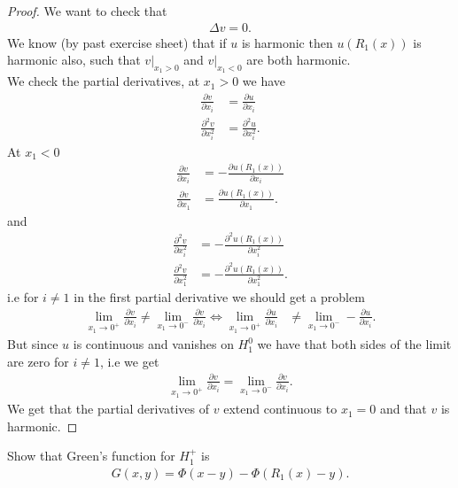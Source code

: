 \begin{proof}
 We want to check that 
 \begin{align*}
  \Delta v = 0
 .\end{align*}
 We know (by past exercise sheet) that if  $u$ is harmonic then $u(R_{1}(x))$ is harmonic also, such that
 $v \rvert_{x_{1}>0}$ and $v \rvert_{x_{1}<0}$ are both harmonic.\\[1ex]
 We check the partial derivatives, at $x_{1}>0$ we have
 \begin{align*}
   \frac{\partial v}{\partial x_i}&=  \frac{\partial u}{\partial x_i}\\
  \frac{\partial ^2 v}{\partial x_i^2}&=  \frac{\partial ^2 u}{\partial x_i^2}
 .\end{align*}
 At $x_1 <0$
 \begin{align*}
   \frac{\partial v}{\partial x_i}&=  - \frac{\partial u(R_{1}(x))}{\partial x_i}  \\
   \frac{\partial v}{\partial x_1} &= \frac{\partial u(R_{1}(x))}{\partial x_1} 
 .\end{align*}
 and 
 \begin{align*}
  \frac{\partial ^2 v}{\partial x_i^2} &= - \frac{\partial ^2 u(R_{1}(x))}{\partial x_i^2}  \\
   \frac{\partial ^2 v}{\partial x_1^2} &= - \frac{\partial ^2 u(R_{1}(x))}{\partial x_1^2}  
 .\end{align*}
 i.e for $i\neq 1$ in the first partial derivative we should get a problem 
 \begin{align*}
   \lim_{x_1 \to 0^{+}  }\frac{\partial v}{\partial x_i}  \neq  \lim_{x_1 \to 0^{-}  }\frac{\partial v}{\partial x_i} \Leftrightarrow \lim_{x_1 \to 0^{+}  }\frac{\partial u}{\partial x_i}  &\neq  \lim_{x_1 \to 0^{-}  } -\frac{\partial u}{\partial x_i}
 .\end{align*}
 But since $u$ is continuous and vanishes on $H_1^{0} $ we have that both sides of the limit are zero for $i\neq 1$, i.e we get 
 \begin{align*}
   \lim_{x_1 \to 0^{+}  }\frac{\partial v}{\partial x_i}  =  \lim_{x_1 \to 0^{-}  }\frac{\partial v}{\partial x_i} 
 .\end{align*} 
 We get that the partial derivatives of $v$ extend continuous to $x_{1}=0$ and that $v$ is harmonic.
\end{proof}
\begin{exercise}[b]
 Show that Green's function for $H_1^{+} $  is 
 \begin{align*}
  G(x,y) = \Phi(x-y) - \Phi(R_1(x)-y)
 .\end{align*}
\end{exercise}
